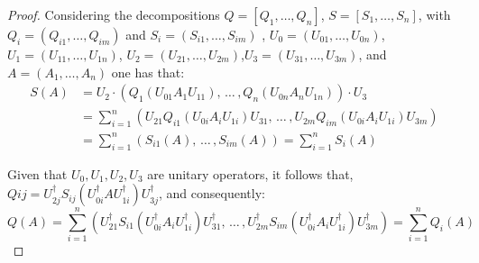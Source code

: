 \begin{proof}
  Considering the decompositions $Q = [Q_1, \ldots, Q_n]$, $S = [S_1, \ldots, S_n]$, with $Q_i = (Q_{i1}, \ldots, Q_{im})$  and $S_i = (S_{i1}, \ldots, S_{im})$ , $U_0 = (U_{01}, \ldots,U_{0n})$, $U_1 = (U_{11}, \ldots,U_{1n})$, $U_2 = (U_{21}, \ldots,U_{2m})$,$ U_3 = (U_{31}, \ldots,U_{3m})$, and $A = (A_1, \ldots, A_n)$ one has that:
  \begin{equation}
    \begin{split}
    S (A) & =  U_2 \cdot \left(Q_1(U_{01}A_1 U_{11}), \hspace{2pt} \ldots \hspace{2pt}, Q_n(U_{0n} A_n U_{1n}) \right) \cdot U_3 \\
    & = \sum_{i=1}^{n} \left( U_{21} Q_{i1} (U_{0i} A_i U_{1i} ) U_{31}, \hspace{2pt} \ldots \hspace{2pt}, U_{2m} Q_{im}(U_{0i}A_i U_{1i}) U_{3m} \right) \\
    & = \sum_{i=1}^{n} \left( S_{i1}(A), \hspace{2pt} \ldots \hspace{2pt}, S_{im}(A) \right) =  \sum_{i=1}^{n} S_i (A)
  \end{split}
  \end{equation}

Given that $U_0, U_1, U_2, U_3$ are unitary operators, it follows that, $Q{ij} = U_{2j}^\dag S_{ij}(U_{0i}^\dag A U_{1i}^\dag) U_{3j}^\dag$, and consequently:
\begin{equation} \label{eq:qi_unitary_invariance}
   Q(A) = \sum_{i=1}^{n} \left( U_{21}^\dag S_{i1} (U_{0i}^\dag A_i U_{1i}^\dag ) U_{31}^\dag, \hspace{2pt} \ldots \hspace{2pt}, U_{2m}^\dag S_{im}(U_{0i}^\dag A_i U_{1i}^\dag) U_{3m}^\dag \right) = \sum_{i=1}^{n} Q_i (A)
\end{equation}


\end{proof}
